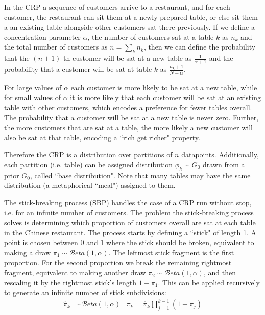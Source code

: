 In the CRP\cite{Neal2000} a sequence of customers arrive to a restaurant, and for each customer, the restaurant can sit them at a newly prepared table, or else sit them a an existing table alongside other customers sat there previously. If we define a concentration parameter $\alpha$, the number of customers sat at a table $k$ as $n_k$ and the total number of customers as $n = \sum_k n_k$, then we can define the probability that the $(n+1)$-th customer will be sat at a new table as $\frac{1}{\alpha + 1}$ and the probability that a customer will be sat at table $k$ as $\frac{n_k + 1}{N + \alpha}$. 

For large values of $\alpha$ each customer is more likely to be sat at a new table, while for small values of $\alpha$ it is more likely that each customer will be sat at an existing table with other customers, which encodes a preference for fewer tables overall. The probability that a customer will be sat at a new table is never zero. Further, the more customers that are sat at a table, the more likely a new customer will also be sat at that table, encoding a ``rich get richer" property.

Therefore the CRP is a distribution over partitions of $n$ datapoints. Additionally, each  partition (i.e. table) can be assigned distribution $\phi_k \sim G_0$ drawn from a prior $G_0$, called ``base distribution". Note that many tables may have the same distribution (a metaphorical ``meal") assigned to them.

The stick-breaking process (SBP) handles the case of a CRP run without stop, i.e. for an infinite number of customers. The problem the stick-breaking process solves is determining which proportion of customers overall are sat at each table in the Chinese restaurant. The process starts by defining a ``stick" of length 1. A point is chosen between $0$ and $1$ where the stick should be broken, equivalent to making a draw $\pi_1 \sim \mathcal{B}eta\left(1, \alpha\right)$. The leftmost stick fragment is the first proportion. For the second proportion we break the remaining rightmost fragment, equivalent to making another draw $\pi_2 \sim \mathcal{B}eta\left(1, \alpha\right)$, and then rescaling it by the rightmost stick's length $1-\pi_1$. This can be applied recursively to generate an infinite number of stick subdivisions:
\begin{align}
\hat{\pi}_k & \sim \mathcal{B}eta\left(1, \alpha\right) & \pi_k = \hat{\pi}_k \prod_{j=1}^{k-1} (1 - \pi_j)
\end{align}

